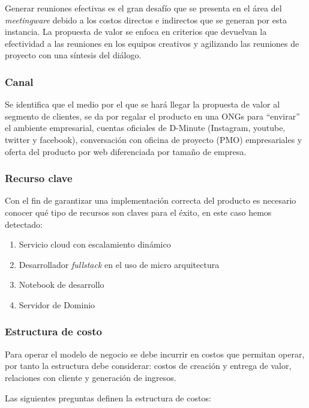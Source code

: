 Generar reuniones efectivas es el gran desafío que se presenta en el área del \textit{meetingware} debido a los costos directos e indirectos que se generan por esta instancia. La propuesta de valor se enfoca en criterios que devuelvan la efectividad a las reuniones en los equipos creativos y agilizando las reuniones de proyecto con una síntesis del diálogo.

\subsubsection{Canal}

Se identifica que el medio por el que se hará llegar la propuesta de valor al segmento de clientes, se da por regalar el producto en una ONGs para “envirar” el ambiente empresarial, cuentas oficiales de D-Minute (Instagram, youtube, twitter y facebook), conversación con oficina de proyecto (PMO) empresariales y oferta del producto por web diferenciada por tamaño de empresa.

\subsubsection{Recurso clave}

Con el fin de garantizar una implementación correcta del producto es necesario conocer qué tipo de recursos son claves para el éxito, en este caso hemos detectado:

\begin{enumerate}[1.]
	\item Servicio cloud con escalamiento dinámico
	\item Desarrollador \textit{fullstack} en el uso de micro arquitectura
	\item Notebook de desarrollo
	\item Servidor de Dominio 
\end{enumerate}

\subsubsection{Estructura de costo}

Para operar el modelo de negocio se debe incurrir en costos que permitan operar, por tanto la estructura debe considerar: costos de creación y entrega de valor, relaciones con cliente y generación de ingresos. 

Las siguientes preguntas definen la estructura de costos:

